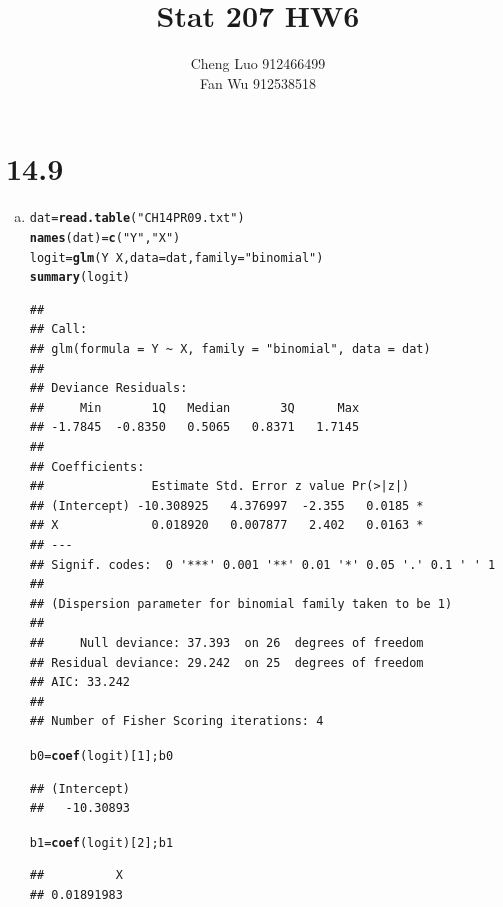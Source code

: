 \documentclass{article}\usepackage[]{graphicx}\usepackage[]{color}
\makeatletter
\newcommand{\hlnum}[1]{\textcolor[rgb]{0.686,0.059,0.569}{#1}}%
\newcommand{\hlstr}[1]{\textcolor[rgb]{0.192,0.494,0.8}{#1}}%
\newcommand{\hlopt}[1]{\textcolor[rgb]{0,0,0}{#1}}%
\newcommand{\hlstd}[1]{\textcolor[rgb]{0.345,0.345,0.345}{#1}}%
\newcommand{\hlkwb}[1]{\textcolor[rgb]{0.69,0.353,0.396}{#1}}%
\newcommand{\hlkwc}[1]{\textcolor[rgb]{0.333,0.667,0.333}{#1}}%
\newcommand{\hlkwd}[1]{\textcolor[rgb]{0.737,0.353,0.396}{\textbf{#1}}}%
\newenvironment{kframe}{%
 \def\at@end@of@kframe{}%
 \ifinner\ifhmode%
  \def\at@end@of@kframe{\end{minipage}}%
  \begin{minipage}{\columnwidth}%
 \fi\fi%
 \def\FrameCommand##1{\hskip\@totalleftmargin \hskip-\fboxsep
 \colorbox{shadecolor}{##1}\hskip-\fboxsep
     \hskip-\linewidth \hskip-\@totalleftmargin \hskip\columnwidth}%
 \MakeFramed {\advance\hsize-\width
   \@totalleftmargin\z@ \linewidth\hsize
   \@setminipage}}%
 {\par\unskip\endMakeFramed%
 \at@end@of@kframe}
\newenvironment{knitrout}{}{} %
\makeatother
\begin{document}
\title{\huge \textbf{Stat 207 HW6} \\}
\author{\large Cheng Luo 912466499 \\ \large Fan Wu 912538518}
\maketitle

\newpage
\mbox{}
\newpage

\section{14.9}

\begin{enumerate}[(a)]

\item

\begin{knitrout}
\color{fgcolor}\begin{kframe}
\begin{alltt}
  \hlstd{dat} \hlkwb{=} \hlkwd{read.table}\hlstd{(}\hlstr{"CH14PR09.txt"}\hlstd{)}
  \hlkwd{names}\hlstd{(dat)} \hlkwb{=} \hlkwd{c}\hlstd{(}\hlstr{"Y"}\hlstd{,} \hlstr{"X"}\hlstd{)}
  \hlstd{logit} \hlkwb{=} \hlkwd{glm}\hlstd{(Y} \hlopt{~} \hlstd{X,} \hlkwc{data} \hlstd{= dat,} \hlkwc{family} \hlstd{=} \hlstr{"binomial"}\hlstd{)}
  \hlkwd{summary}\hlstd{(logit)}
\end{alltt}
\begin{verbatim}
## 
## Call:
## glm(formula = Y ~ X, family = "binomial", data = dat)
## 
## Deviance Residuals: 
##     Min       1Q   Median       3Q      Max  
## -1.7845  -0.8350   0.5065   0.8371   1.7145  
## 
## Coefficients:
##               Estimate Std. Error z value Pr(>|z|)  
## (Intercept) -10.308925   4.376997  -2.355   0.0185 *
## X             0.018920   0.007877   2.402   0.0163 *
## ---
## Signif. codes:  0 '***' 0.001 '**' 0.01 '*' 0.05 '.' 0.1 ' ' 1
## 
## (Dispersion parameter for binomial family taken to be 1)
## 
##     Null deviance: 37.393  on 26  degrees of freedom
## Residual deviance: 29.242  on 25  degrees of freedom
## AIC: 33.242
## 
## Number of Fisher Scoring iterations: 4
\end{verbatim}
\begin{alltt}
  \hlstd{b0} \hlkwb{=} \hlkwd{coef}\hlstd{(logit)[}\hlnum{1}\hlstd{]; b0}
\end{alltt}
\begin{verbatim}
## (Intercept) 
##   -10.30893
\end{verbatim}
\begin{alltt}
  \hlstd{b1} \hlkwb{=} \hlkwd{coef}\hlstd{(logit)[}\hlnum{2}\hlstd{]; b1}
\end{alltt}
\begin{verbatim}
##          X 
## 0.01891983
\end{verbatim}
\end{kframe}
\end{knitrout}


\end{enumerate}
\end{document}
